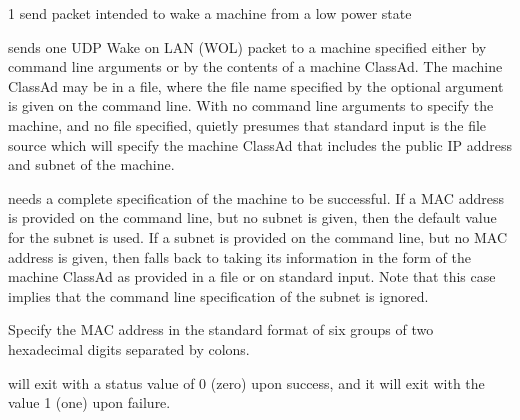 \begin{ManPage}{\label{man-condor-power}}{1}
{send packet intended to wake a machine from a low power state}
\Synopsis 
{}




\Description

 sends one UDP Wake on LAN (WOL) packet to a machine
specified either by command line arguments or by the contents
of a machine ClassAd.
The machine ClassAd may be in a file, where the 
file name specified by the optional argument  
is given on the command line.
With no command line arguments to specify the machine,
and no file specified,  quietly presumes that standard input
is the file source which will
specify the machine ClassAd that includes the public IP address
and subnet of the machine.

 needs a complete specification of the machine to
be successful.
If a MAC address is provided on the command line, but no subnet is given,
then the default value for the subnet is used.
If a subnet is provided on the command line, but no MAC address is given,
then  falls back to taking its information in the form
of the machine ClassAd as provided in a file or on standard input.
Note that this case implies that the command line specification of the 
subnet is ignored.


\begin{Options}
   {Specify the MAC address in the standard
    format of six groups of two hexadecimal digits separated by colons. }
\end{Options}

\ExitStatus

 will exit with a status value of 0 (zero) upon success,
and it will exit with the value 1 (one) upon failure.

\end{ManPage}
